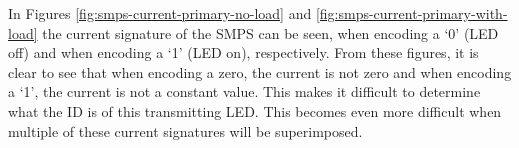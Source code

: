 In Figures \ref{fig:smps-current-primary-no-load} and \ref{fig:smps-current-primary-with-load} the current signature of the SMPS can be seen, when encoding a `0' (LED off) and when encoding a `1' (LED on), respectively.
From these figures, it is clear to see that when encoding a zero, the current is not zero and when encoding a `1', the current is not a constant value.
This makes it difficult to determine what the ID is of this transmitting LED.
This becomes even more difficult when multiple of these current signatures will be superimposed.




